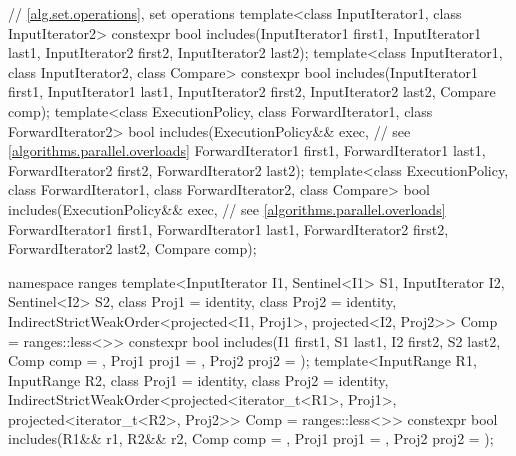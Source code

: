 \begin{codeblock}
{  // \ref{alg.set.operations}, set operations
  template<class InputIterator1, class InputIterator2>
    constexpr bool includes(InputIterator1 first1, InputIterator1 last1,
                            InputIterator2 first2, InputIterator2 last2);
  template<class InputIterator1, class InputIterator2, class Compare>
    constexpr bool includes(InputIterator1 first1, InputIterator1 last1,
                            InputIterator2 first2, InputIterator2 last2,
                            Compare comp);
  template<class ExecutionPolicy, class ForwardIterator1, class ForwardIterator2>
    bool includes(ExecutionPolicy&& exec, // see \ref{algorithms.parallel.overloads}
                  ForwardIterator1 first1, ForwardIterator1 last1,
                  ForwardIterator2 first2, ForwardIterator2 last2);
  template<class ExecutionPolicy, class ForwardIterator1, class ForwardIterator2,
           class Compare>
    bool includes(ExecutionPolicy&& exec, // see \ref{algorithms.parallel.overloads}
                  ForwardIterator1 first1, ForwardIterator1 last1,
                  ForwardIterator2 first2, ForwardIterator2 last2,
                  Compare comp);

  namespace ranges {
    template<InputIterator I1, Sentinel<I1> S1, InputIterator I2, Sentinel<I2> S2,
             class Proj1 = identity, class Proj2 = identity,
             IndirectStrictWeakOrder<projected<I1, Proj1>, projected<I2, Proj2>> Comp =
               ranges::less<>>
      constexpr bool includes(I1 first1, S1 last1, I2 first2, S2 last2, Comp comp = {},
                              Proj1 proj1 = {}, Proj2 proj2 = {});
    template<InputRange R1, InputRange R2, class Proj1 = identity,
             class Proj2 = identity,
             IndirectStrictWeakOrder<projected<iterator_t<R1>, Proj1>,
                                     projected<iterator_t<R2>, Proj2>> Comp = ranges::less<>>
      constexpr bool includes(R1&& r1, R2&& r2, Comp comp = {},
                              Proj1 proj1 = {}, Proj2 proj2 = {});
  }

}
\end{codeblock}
